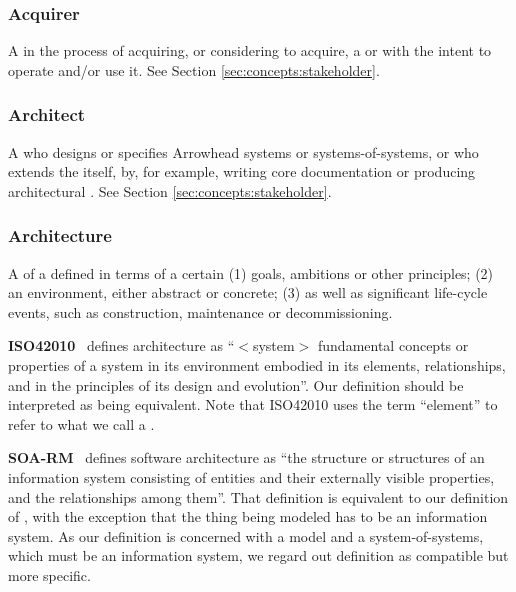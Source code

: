 {

\newcommand{\GlossaryEntry}[3][]{\subsubsection*{#3\IfStrEq{#1}{}{}{ {\normalfont \textit{#1}}}}\label{sec:glossary:#2}}
\newcommand{\GlossaryNote}[2]{\begin{minipage}[b]{\dimexpr\linewidth-0.5cm\relax}\vspace*{0.33cm}\footnotesize{\textbf{#1}\ #2}\end{minipage}}

\GlossaryEntry{acquirer}{Acquirer}
A  in the process of acquiring, or considering to acquire, a  or  with the intent to operate and/or use it.
See Section \ref{sec:concepts:stakeholder}.

\GlossaryEntry{architect}{Architect}
A  who designs or specifies Arrowhead systems or systems-of-systems, or who extends the  itself, by, for example, writing core documentation or producing architectural .
See Section \ref{sec:concepts:stakeholder}.

\GlossaryEntry{architecture}{Architecture}
A  of a  defined in terms of a certain (1) goals, ambitions or other principles; (2) an environment, either abstract or concrete; (3) as well as significant life-cycle events, such as construction, maintenance or decommissioning.

	\GlossaryNote{ISO42010}{
		defines architecture as ``$<$system$>$ fundamental concepts or properties of a system in its environment embodied in its elements, relationships, and in the principles of its design and evolution''.
		Our definition should be interpreted as being equivalent.
		Note that ISO42010 uses the term ``element'' to refer to what we call a \textit{ \GlossaryHyperRef{entity}{entity}}.
	}

	\GlossaryNote{SOA-RM}{
		defines software architecture as ``the structure or structures of an information system consisting of entities and their externally visible properties, and the relationships among them''.
		That definition is equivalent to our definition of \GlossaryHyperRef{model}{model}, with the exception that the thing being modeled has to be an information system.
		As our definition is concerned with a model and a system-of-systems, which must be an information system, we regard out definition as compatible but more specific.
	}

}
